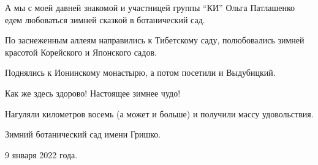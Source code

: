 А мы с моей давней знакомой и участницей группы \enquote{КИ} Ольга Патлашенко
едем любоваться зимней сказкой в ботанический сад.

По заснеженным аллеям  направились к Тибетскому саду, полюбовались зимней
красотой Корейского и Японского садов.


Поднялись к Ионинскому монастырю, а потом посетили и Выдубицкий.

Как же здесь здорово! Настоящее зимнее чудо!

Нагуляли километров восемь (а может и больше)  и получили массу удовольствия.

Зимний ботанический сад имени Гришко.

9 января 2022 года.

